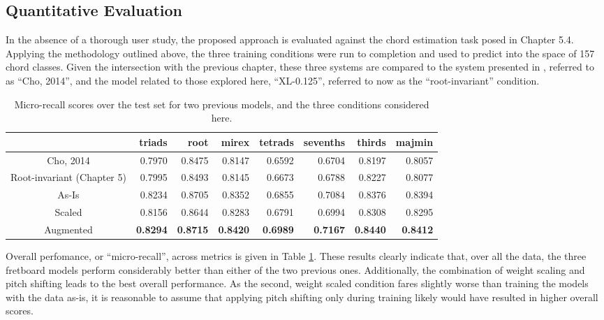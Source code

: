 \subsection{Quantitative Evaluation}
\label{subsec:evaluation}

In the absence of a thorough user study, the proposed approach is evaluated against the chord estimation task posed in Chapter 5.4.
Applying the methodology outlined above, the three training conditions were run to completion and used to predict into the space of 157 chord classes.
Given the intersection with the previous chapter, these three systems are compared to the system presented in \cite{Cho2014}, referred to as ``Cho, 2014'', and the model related to those explored here, ``XL-0.125'', referred to now as the ``root-invariant'' condition.

\begin{table}[t]
\begin{center}
\scriptsize
\caption{Micro-recall scores over the test set for two previous models, and the three conditions considered here.}
\label{tab:test_micro}
\begin{tabular}{c|rrrrrrr}

\hline
 & triads &   root &   mirex &   tetrads &   sevenths &   thirds &   majmin \\
\hline
Cho, 2014 & 0.7970 & 0.8475 & 0.8147 & 0.6592 & 0.6704 & 0.8197 & 0.8057 \\
\hline
Root-invariant (Chapter 5)  & 0.7995 & 0.8493 & 0.8145 & 0.6673 & 0.6788 & 0.8227 & 0.8077 \\
\hline
As-Is     & 0.8234 & 0.8705 & 0.8352 & 0.6855 & 0.7084 & 0.8376 & 0.8394 \\
Scaled    & 0.8156 & 0.8644 & 0.8283 & 0.6791 & 0.6994 & 0.8308 & 0.8295 \\
Augmented & \textbf{0.8294} & \textbf{0.8715} & \textbf{0.8420} & \textbf{0.6989} & \textbf{0.7167} & \textbf{0.8440} & \textbf{0.8412} \\
\hline
\end{tabular}
\end{center}
\end{table}

Overall perfomance, or ``micro-recall'', across metrics is given in Table \ref{tab:test_micro}.
These results clearly indicate that, over all the data, the three fretboard models perform considerably better than either of the two previous ones.
Additionally, the combination of weight scaling and pitch shifting leads to the best overall performance.
As the second, weight scaled condition fares slightly worse than training the models with the data as-is, it is reasonable to assume that applying pitch shifting only during training likely would have resulted in higher overall scores.


